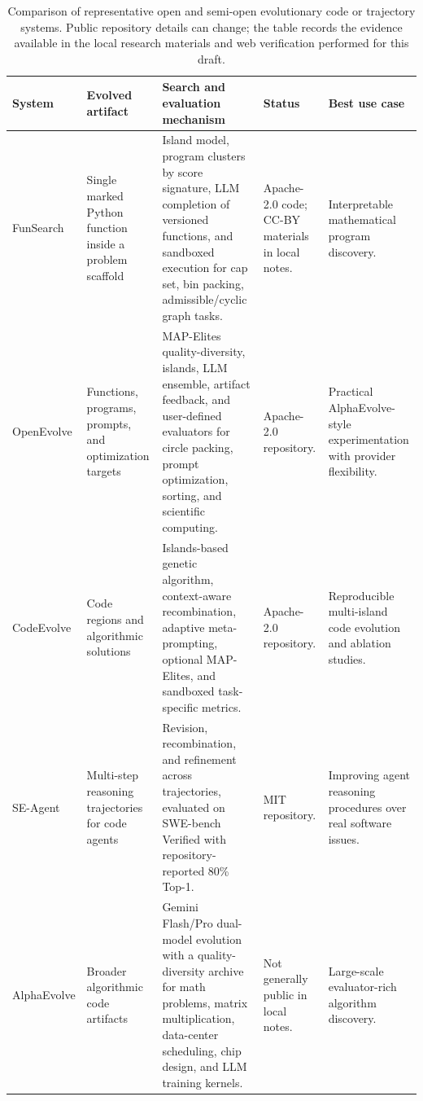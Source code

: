 \begin{table}[t]
\centering
\caption{Comparison of representative open and semi-open evolutionary code or trajectory systems.  Public repository details can change; the table records the evidence available in the local research materials and web verification performed for this draft.}
\label{tab:open-source-evolution-systems}
{\TableTight
\begin{tabularx}{\textwidth}{@{}L{0.12\textwidth}L{0.18\textwidth}L{0.34\textwidth}L{0.14\textwidth}Y@{}}
\toprule
\textbf{System} & \textbf{Evolved artifact} & \textbf{Search and evaluation mechanism} & \textbf{Status} & \textbf{Best use case} \\
\midrule
FunSearch & Single marked Python function inside a problem scaffold & Island model, program clusters by score signature, LLM completion of versioned functions, and sandboxed execution for cap set, bin packing, admissible/cyclic graph tasks. & Apache-2.0 code; CC-BY materials in local notes. & Interpretable mathematical program discovery. \\
OpenEvolve & Functions, programs, prompts, and optimization targets & MAP-Elites quality-diversity, islands, LLM ensemble, artifact feedback, and user-defined evaluators for circle packing, prompt optimization, sorting, and scientific computing. & Apache-2.0 repository. & Practical AlphaEvolve-style experimentation with provider flexibility. \\
CodeEvolve & Code regions and algorithmic solutions & Islands-based genetic algorithm, context-aware recombination, adaptive meta-prompting, optional MAP-Elites, and sandboxed task-specific metrics. & Apache-2.0 repository. & Reproducible multi-island code evolution and ablation studies. \\
SE-Agent & Multi-step reasoning trajectories for code agents & Revision, recombination, and refinement across trajectories, evaluated on SWE-bench Verified with repository-reported 80\% Top-1. & MIT repository. & Improving agent reasoning procedures over real software issues. \\
AlphaEvolve & Broader algorithmic code artifacts & Gemini Flash/Pro dual-model evolution with a quality-diversity archive for math problems, matrix multiplication, data-center scheduling, chip design, and LLM training kernels. & Not generally public in local notes. & Large-scale evaluator-rich algorithm discovery. \\
\bottomrule
\end{tabularx}}
\end{table}

